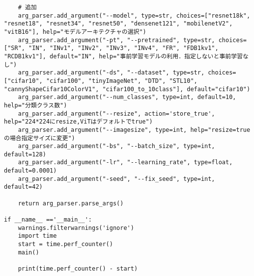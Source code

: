 {\begin{verbatim}
    # 追加
    arg_parser.add_argument("--model", type=str, choices=["resnet18k", "resnet18", "resnet34", "resnet50", "densenet121", "mobilenetV2", "vitB16"], help="モデルアーキテクチャの選択")
    arg_parser.add_argument("-pt", "--pretrained", type=str, choices=["SR", "IN", "INv1", "INv2", "INv3", "INv4", "FR", "FDB1kv1", "RCDB1kv1"], default="IN", help="事前学習モデルの利用．指定しないと事前学習なし")
    arg_parser.add_argument("-ds", "--dataset", type=str, choices=["cifar10", "cifar100", "tinyImageNet", "DTD", "STL10", "cannyShapeCifar10ColorV1", "cifar100_to_10class"], default="cifar10")
    arg_parser.add_argument("--num_classes", type=int, default=10, help="分類クラス数")
    arg_parser.add_argument("--resize", action='store_true', help="224*224にresize,ViTはデフォルトでtrue")
    arg_parser.add_argument("--imagesize", type=int, help="resize=trueの場合指定サイズに変更")
    arg_parser.add_argument("-bs", "--batch_size", type=int, default=128)
    arg_parser.add_argument("-lr", "--learning_rate", type=float, default=0.0001)
    arg_parser.add_argument("-seed", "--fix_seed", type=int, default=42)

    return arg_parser.parse_args()

if __name__ =='__main__':
    warnings.filterwarnings('ignore')
    import time
    start = time.perf_counter()
    main()
    
    print(time.perf_counter() - start)

\end{verbatim}
}